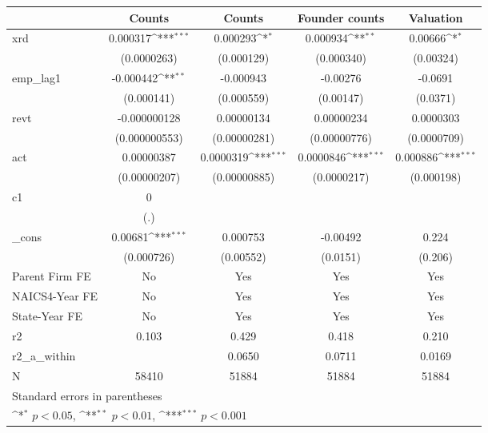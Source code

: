 {
\def\sym#1{\ifmmode^{#1}\else\(^{#1}\)\fi}
\begin{tabular}{l*{4}{c}}
\hline\hline
            &\multicolumn{1}{c}{Counts}&\multicolumn{1}{c}{Counts}&\multicolumn{1}{c}{Founder counts}&\multicolumn{1}{c}{Valuation}\\
\hline
xrd         &    0.000317\sym{***}&    0.000293\sym{*}  &    0.000934\sym{**} &     0.00666\sym{*}  \\
            & (0.0000263)         &  (0.000129)         &  (0.000340)         &   (0.00324)         \\
[1em]
emp\_lag1    &   -0.000442\sym{**} &   -0.000943         &    -0.00276         &     -0.0691         \\
            &  (0.000141)         &  (0.000559)         &   (0.00147)         &    (0.0371)         \\
[1em]
revt        &-0.000000128         &  0.00000134         &  0.00000234         &   0.0000303         \\
            &(0.000000553)         &(0.00000281)         &(0.00000776)         & (0.0000709)         \\
[1em]
act         &  0.00000387         &   0.0000319\sym{***}&   0.0000846\sym{***}&    0.000886\sym{***}\\
            &(0.00000207)         &(0.00000885)         & (0.0000217)         &  (0.000198)         \\
[1em]
c1          &           0         &                     &                     &                     \\
            &         (.)         &                     &                     &                     \\
[1em]
\_cons      &     0.00681\sym{***}&    0.000753         &    -0.00492         &       0.224         \\
            &  (0.000726)         &   (0.00552)         &    (0.0151)         &     (0.206)         \\
[1em]
Parent Firm FE&          No         &         Yes         &         Yes         &         Yes         \\
[1em]
NAICS4-Year FE&          No         &         Yes         &         Yes         &         Yes         \\
[1em]
State-Year FE&          No         &         Yes         &         Yes         &         Yes         \\
\hline
r2          &       0.103         &       0.429         &       0.418         &       0.210         \\
r2\_a\_within &                     &      0.0650         &      0.0711         &      0.0169         \\
N           &       58410         &       51884         &       51884         &       51884         \\
\hline\hline
\multicolumn{5}{l}{\footnotesize Standard errors in parentheses}\\
\multicolumn{5}{l}{\footnotesize \sym{*} \(p<0.05\), \sym{**} \(p<0.01\), \sym{***} \(p<0.001\)}\\
\end{tabular}
}
